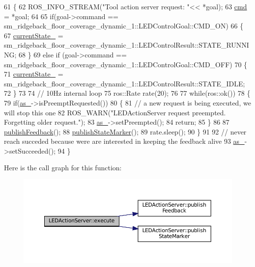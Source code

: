 \begin{DoxyCode}
61 \{
62   ROS\_INFO\_STREAM(\textcolor{stringliteral}{"Tool action server request: "}<< *goal);
63   \hyperlink{classLEDActionServer_a4d3a4c07e7659cdd78228932bb1634d3}{cmd} = *goal;
64 
65   \textcolor{keywordflow}{if}(goal->command == sm\_ridgeback\_floor\_coverage\_dynamic\_1::LEDControlGoal::CMD\_ON)
66   \{
67     \hyperlink{classLEDActionServer_a1dc456e987dc331501ad6ff2215661ff}{currentState\_} =  sm\_ridgeback\_floor\_coverage\_dynamic\_1::LEDControlResult::STATE\_RUNNING;
68   \}
69   \textcolor{keywordflow}{else}  \textcolor{keywordflow}{if} (goal->command == sm\_ridgeback\_floor\_coverage\_dynamic\_1::LEDControlGoal::CMD\_OFF)
70   \{
71     \hyperlink{classLEDActionServer_a1dc456e987dc331501ad6ff2215661ff}{currentState\_} =  sm\_ridgeback\_floor\_coverage\_dynamic\_1::LEDControlResult::STATE\_IDLE;
72   \}
73 
74   \textcolor{comment}{// 10Hz internal loop}
75   ros::Rate rate(20);
76 
77   \textcolor{keywordflow}{while}(ros::ok())
78   \{
79     \textcolor{keywordflow}{if}(\hyperlink{classLEDActionServer_a61d21c77642081acf017d4ebd65b2de0}{as\_}->isPreemptRequested())
80     \{
81        \textcolor{comment}{// a new request is being executed, we will stop this one}
82        ROS\_WARN(\textcolor{stringliteral}{"LEDActionServer request preempted. Forgetting older request."});
83        \hyperlink{classLEDActionServer_a61d21c77642081acf017d4ebd65b2de0}{as\_}->setPreempted(); 
84        \textcolor{keywordflow}{return};
85     \}
86     
87     \hyperlink{classLEDActionServer_a25c93d4e7ecdacbb4f5b090d7789aa36}{publishFeedback}();
88     \hyperlink{classLEDActionServer_a73bb754ac2347c50660624ad92315895}{publishStateMarker}();
89     rate.sleep();
90   \}
91 
92    \textcolor{comment}{// never reach succeded because were are interested in keeping the feedback alive}
93    \hyperlink{classLEDActionServer_a61d21c77642081acf017d4ebd65b2de0}{as\_}->setSucceeded();
94 \}
\end{DoxyCode}
Here is the call graph for this function\+:
\nopagebreak
\begin{figure}[H]
\begin{center}
\leavevmode
\includegraphics[width=350pt]{classLEDActionServer_aa7de924a8ea5f74b85d14782f4661a67_cgraph}
\end{center}
\end{figure}
\mbox{\label{classLEDActionServer_aea69ee96367e9f6a82d6302f148505d6}} 

